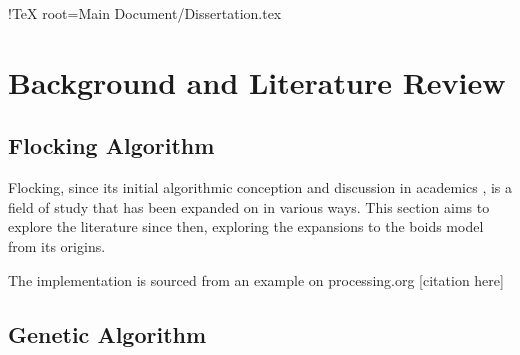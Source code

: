 !TeX root=Main Document/Dissertation.tex

\section{Background and Literature Review}
	
	\subsection{Flocking Algorithm}
	Flocking, since its initial algorithmic conception and discussion in academics \citep{Reynolds:1987:FHS:37402.37406},
	is a field of study that has been expanded on in various ways. This section aims to explore the literature since then,
	exploring the expansions to the boids model from its origins.
	
	The implementation is sourced from an example on processing.org [citation here] 
	
	
	\subsection{Genetic Algorithm}

	

	